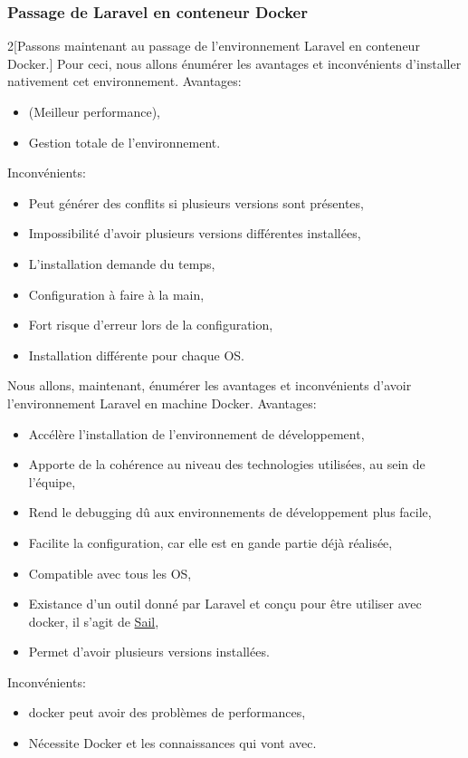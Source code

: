 \documentclass[
    iai, %
    il, %
]{heig-tb}
\begin{document}
\subsubsection{Passage de Laravel en conteneur Docker}
\begin{multicols}{2}[Passons maintenant au passage de l'environnement Laravel en conteneur Docker.]
    Pour ceci, nous allons énumérer les avantages et inconvénients d'installer nativement cet environnement.
    Avantages:
    \begin{itemize}
        \item (Meilleur performance),
        \item Gestion totale de l'environnement.
    \end{itemize}

    Inconvénients:
    \begin{itemize}
        \item Peut générer des conflits si plusieurs versions sont présentes,
        \item Impossibilité d'avoir plusieurs versions différentes installées,
        \item L'installation demande du temps,
        \item Configuration à faire à la main,
        \item Fort risque d'erreur lors de la configuration,
        \item Installation différente pour chaque OS.
    \end{itemize}

    \columnbreak
    Nous allons, maintenant, énumérer les avantages et inconvénients d'avoir l'environnement Laravel en machine Docker.
    Avantages:
    \begin{itemize}
        \item Accélère l'installation de l'environnement de développement, \cite{labrecque}
        \item Apporte de la cohérence au niveau des technologies utilisées, au sein de l'équipe, \cite{labrecque, data-flair-use-cases}
        \item Rend le debugging dû aux environnements de développement plus facile, \cite{labrecque,koukia}
        \item Facilite la configuration, car elle est en gande partie déjà réalisée, \cite{data-flair-pros-cons}
        \item Compatible avec tous les OS,
        \item Existance d'un outil donné par Laravel et conçu pour être utiliser avec \Gls{docker}, il s'agit de \href{https://laravel.com/docs/9.x/sail}{Sail},
        \item Permet d'avoir plusieurs versions installées.
    \end{itemize}

    Inconvénients:
    \begin{itemize}
        \item \Gls{docker} peut avoir des problèmes de performances, \cite{labrecque}
        \item Nécessite Docker et les connaissances qui vont avec. \cite{labrecque}
    \end{itemize}
\end{multicols}
\end{document}
